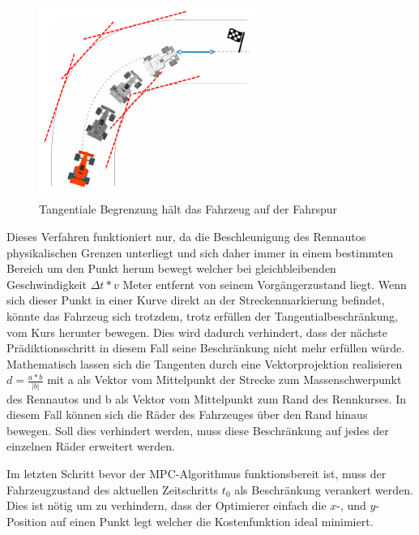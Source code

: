 \documentclass{like}
\begin{document}
\begin{figure}[ht!]
	\centering
	\includegraphics[width=200pt]{Abbildungen/tangentialConstraint.png}
	\caption{Tangentiale Begrenzung hält das Fahrzeug auf der Fahrspur}
	\label{fig:costGoalDist}
\end{figure}
Dieses Verfahren funktioniert nur, da die Beschleunigung des Rennautos physikalischen Grenzen unterliegt und sich daher immer in einem bestimmten Bereich um den Punkt herum bewegt welcher bei gleichbleibenden Geschwindigkeit $\Delta t * v$ Meter entfernt von seinem Vorgängerzustand liegt. Wenn sich dieser Punkt in einer Kurve direkt an der Streckenmarkierung befindet, könnte das Fahrzeug sich trotzdem, trotz erfüllen der Tangentialbeschränkung, vom Kurs herunter bewegen. Dies wird dadurch verhindert, dass der nächste Prädiktionsschritt in diesem Fall seine Beschränkung nicht mehr erfüllen würde.
Mathematisch lassen sich die Tangenten durch eine Vektorprojektion realisieren\\
$d = \frac{a*b}{|b|}$ mit a als Vektor vom Mittelpunkt der Strecke zum Massenschwerpunkt des Rennautos und b als Vektor vom Mittelpunkt zum Rand des Rennkurses. In diesem Fall können sich die Räder des Fahrzeuges über den Rand hinaus bewegen. Soll dies verhindert werden, muss diese Beschränkung auf jedes der einzelnen Räder erweitert werden.

Im letzten Schritt bevor der \ac{MPC}-Algorithmus funktionsbereit ist, muss der Fahrzeugzustand des aktuellen Zeitschritts $t_0$ als Beschränkung verankert werden.  Dies ist nötig um zu verhindern, dass der Optimierer einfach die \(x\)-, und \(y\)-Position auf einen Punkt legt welcher die Kostenfunktion ideal minimiert. 
\end{document}
